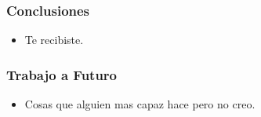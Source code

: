 \begin{frame}
  \frametitle{Conclusiones}
      \begin{itemize}
      \item Te recibiste.
      \end{itemize}
\end{frame}

\begin{frame}
  \frametitle{Trabajo a Futuro}
      \begin{itemize}
      \item Cosas que alguien mas capaz hace pero no creo.
      \end{itemize}
\end{frame}
